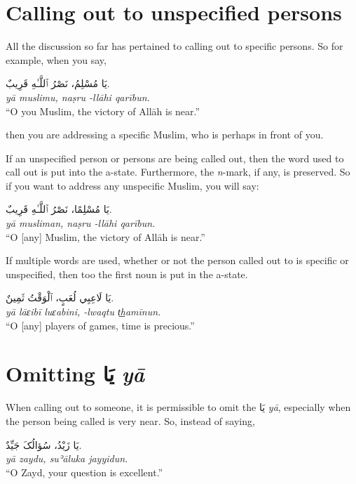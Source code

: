 \documentclass[
  10pt,
]{book}
\begin{document}
\section{Calling out to unspecified persons}\label{calling-out-to-unspecified-persons}

All the discussion so far has pertained to calling out to specific persons. So for example, when you say,

\foreignlanguage{arabic}{يَا مُسْلِمُ، نَصْرُ ٱللَّـٰهِ قَرِيبٌ.}\\
\emph{yā muslimu, naṣru -llāhi qarībun.}\\
\enquote{O you Muslim, the victory of Allāh is near.}

then you are addressing a specific Muslim, who is perhaps in front of you.

If an unspecified person or persons are being called out, then the word used to call out is put into the a-state. Furthermore, the \emph{n}-mark, if any, is preserved. So if you want to address any unspecific Muslim, you will say:

\foreignlanguage{arabic}{يَا مُسْلِمًا، نَصْرُ ٱللَّـٰهِ قَرِيبٌ.}\\
\emph{yā musliman, naṣru -llāhi qarībun.}\\
\enquote{O {[}any{]} Muslim, the victory of Allāh is near.}

If multiple words are used, whether or not the person called out to is specific or unspecified, then too the first noun is put in the a-state.

\foreignlanguage{arabic}{يَا لَاعِبِي لُعَبٍ، ٱلْوَقْتُ ثَمِينٌ.}\\
\emph{yā lāɛibī luɛabini, -lwaqtu t͟hamīnun.}\\
\enquote{O {[}any{]} players of games, time is precious.}

\section{\texorpdfstring{Omitting \foreignlanguage{arabic}{يَا} \emph{yā}}{Omitting يَا yā}}\label{omitting-ux64aux627-ya}

When calling out to someone, it is permissible to omit the \foreignlanguage{arabic}{يَا} \emph{yā}, especially when the person being called is very near. So, instead of saying,

\foreignlanguage{arabic}{يَا زَيْدُ، سُؤالُکَ جَيِّدٌ.}\\
\emph{yā zaydu, suʾāluka jayyidun.}\\
\enquote{O Zayd, your question is excellent.}
\end{document}
